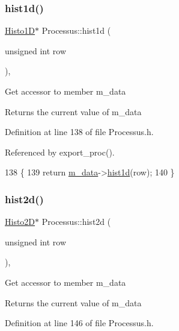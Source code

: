 \subsubsection{\texorpdfstring{hist1d()}{hist1d()}}
{\footnotesize\ttfamily \hyperlink{classHisto1D}{Histo1D}$\ast$ Processus\+::hist1d (\begin{DoxyParamCaption}\item[{unsigned int}]{row }\end{DoxyParamCaption})\hspace{0.3cm}{\ttfamily [inline]}, {\ttfamily [inherited]}}

Get accessor to member m\+\_\+data \begin{DoxyReturn}{Returns}
the current value of m\+\_\+data 
\end{DoxyReturn}


Definition at line 138 of file Processus.\+h.



Referenced by export\+\_\+proc().


\begin{DoxyCode}
138                                    \{
139     \textcolor{keywordflow}{return} \hyperlink{classProcessus_a3da9a9de8af54e2f47807a3e09dfccff}{m\_data}->\hyperlink{classData_a476a66728ccfc553909d15b36c22492a}{hist1d}(row);
140   \}
\end{DoxyCode}
\mbox{\label{classProcessus_a73b5118cb5f2b5eaad33286183b86cfc}} 
\subsubsection{\texorpdfstring{hist2d()}{hist2d()}}
{\footnotesize\ttfamily \hyperlink{classHisto2D}{Histo2D}$\ast$ Processus\+::hist2d (\begin{DoxyParamCaption}\item[{unsigned int}]{row }\end{DoxyParamCaption})\hspace{0.3cm}{\ttfamily [inline]}, {\ttfamily [inherited]}}

Get accessor to member m\+\_\+data \begin{DoxyReturn}{Returns}
the current value of m\+\_\+data 
\end{DoxyReturn}


Definition at line 146 of file Processus.\+h.




